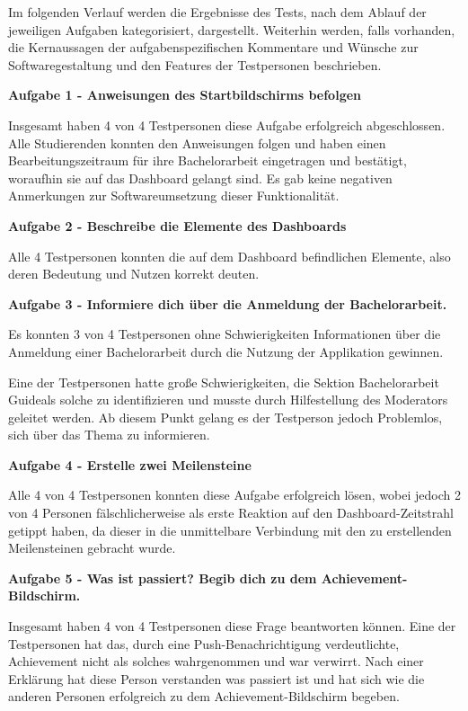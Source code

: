\documentclass[bibliography=totoc,listof=totoc,BCOR=5mm,DIV=12,oneside]{scrbook}
\begin{document}
\par \bigskip Im folgenden Verlauf werden die Ergebnisse des Tests, nach dem Ablauf der jeweiligen Aufgaben kategorisiert, dargestellt. Weiterhin werden, falls vorhanden, die Kernaussagen der aufgabenspezifischen Kommentare und Wünsche zur Softwaregestaltung und den Features der Testpersonen beschrieben.


\par \bigskip \textbf{Aufgabe 1 - Anweisungen des Startbildschirms befolgen}
\par Insgesamt haben 4 von 4 Testpersonen diese Aufgabe erfolgreich abgeschlossen. Alle Studierenden konnten den Anweisungen folgen und haben einen Bearbeitungszeitraum für ihre Bachelorarbeit eingetragen und bestätigt, woraufhin sie auf das Dashboard gelangt sind. Es gab keine negativen Anmerkungen zur Softwareumsetzung dieser Funktionalität.

\par \bigskip \textbf{Aufgabe 2 - Beschreibe die Elemente des Dashboards}
\par Alle 4 Testpersonen konnten die auf dem Dashboard befindlichen Elemente, also deren Bedeutung und Nutzen korrekt deuten.

\par \bigskip \textbf{Aufgabe 3 - Informiere dich über die Anmeldung der Bachelorarbeit.}
\par Es konnten 3 von 4 Testpersonen ohne Schwierigkeiten  Informationen über die Anmeldung einer Bachelorarbeit durch die Nutzung der Applikation gewinnen. 
\par \medskip Eine der Testpersonen hatte große Schwierigkeiten, die Sektion \grqq Bachelorarbeit Guide\grqq als solche zu identifizieren und musste durch Hilfestellung des Moderators geleitet werden. Ab diesem Punkt gelang es der Testperson jedoch Problemlos, sich über das Thema zu informieren.

\par \bigskip \textbf{Aufgabe 4 - Erstelle zwei Meilensteine}
\par Alle 4 von 4 Testpersonen konnten diese Aufgabe erfolgreich lösen, wobei jedoch 2 von 4 Personen fälschlicherweise als erste Reaktion auf den Dashboard-Zeitstrahl getippt haben, da dieser in die unmittelbare Verbindung mit den zu erstellenden Meilensteinen gebracht wurde.

\par \bigskip \textbf{Aufgabe 5 - Was ist passiert? Begib dich zu dem Achievement-Bildschirm.}
\par Insgesamt haben 4 von 4 Testpersonen diese Frage beantworten können. Eine der Testpersonen hat das, durch eine Push-Benachrichtigung verdeutlichte, Achievement nicht als solches wahrgenommen und war verwirrt. Nach einer Erklärung hat diese Person verstanden was passiert ist und hat sich wie die anderen Personen erfolgreich zu dem Achievement-Bildschirm begeben.
\end{document}
